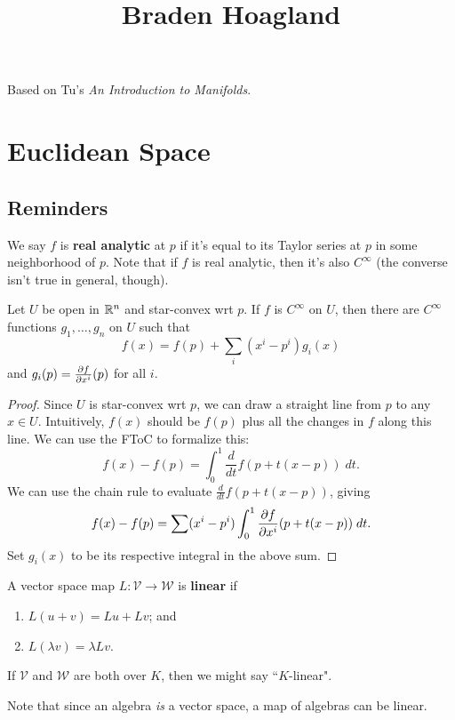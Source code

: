 \documentclass[twoside,10pt]{report}
\begin{document}
\title{Braden Hoagland}{Based on Tu's \textit{An Introduction to Manifolds}.}

\tableofcontents


\chapter{Euclidean Space}

\section{Reminders}

We say $f$ is \textbf{real analytic} at $p$ if it's equal to its Taylor series at $p$ in some neighborhood of $p$. Note that if $f$ is real analytic, then it's also $C^{\infty}$ (the converse isn't true in general, though).

\begin{prop}
	\label{baby-taylor}
	Let $U$ be open in $\mathbb{R}^{n}$ and star-convex wrt $p$. If $f$ is $C^{\infty}$ on $U$, then there are $C^{\infty}$ functions $g_1, \dots, g_{n}$ on $U$ such that
	\[
		f(x) = f(p) + \sum_{i}(x^{i}-p^{i}) g_{i}(x)
	\] and $g_{i}(p) = \frac{\partial f}{\partial x^{i}} (p)$ for all $i$.
\end{prop}
\begin{proof}
	Since $U$ is star-convex wrt $p$, we can draw a straight line from $p$ to any $x \in U$. Intuitively, $f(x)$ should be $f(p)$ plus all the changes in $f$ along this line. We can use the FToC to formalize this:
	\[
		f(x) - f(p) = \int_{0}^{1} \frac{d}{dt} f(p+t(x-p))\;dt.
	\]
	We can use the chain rule to evaluate $\frac{d}{dt} f(p+t(x-p))$, giving
	\[
		f(x) - f(p) = \sum (x^{i} - p^{i}) \int_{0}^{1} \frac{\partial f}{\partial x^{i}} (p+t(x-p)) \;dt.
	\] 
	Set $g_{i}(x)$ to be its respective integral in the above sum.
\end{proof}

\begin{defn}[]
A vector space map $L:\mathcal{V}\to \mathcal{W}$ is \textbf{linear} if
\begin{enumerate}
	\item $L(u+v) = Lu + Lv$; and
	\item $L(\lambda v) = \lambda Lv$.
\end{enumerate}
If $\mathcal{V}$ and $\mathcal{W}$ are both over $K$, then we might say ``$K$-linear".
\end{defn}
Note that since an algebra \textit{is} a vector space, a map of algebras can be linear.
\end{document}
